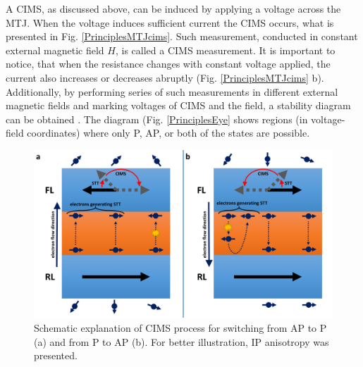 \label{sec:PrinciplesCIMSmeas}   
    A CIMS, as discussed above, can be induced by applying a voltage across the MTJ. When the voltage induces sufficient current the CIMS occurs, what is presented in Fig. \ref{PrinciplesMTJcims}. Such measurement, conducted in constant external magnetic field $H$, is called a CIMS measurement. It is important to notice, that when the resistance changes with constant voltage applied, the current also increases or decreases abruptly (Fig. \ref{PrinciplesMTJcims} b). Additionally, by performing series of such measurements in different external magnetic fields and marking voltages of CIMS and the field, a stability diagram can be obtained \cite{skowronski2017understanding}. The diagram (Fig. \ref{PrinciplesEye} shows regions (in voltage-field coordinates) where only P, AP, or both of the states are possible.
    
    \begin{figure}[H]
        \centering
        \includegraphics[width=0.75\paperwidth, page=1]{img/03/STT_sch.pdf}
        \caption{Schematic explanation of CIMS process for switching from AP to P (a) and from P to AP (b). For better illustration, IP anisotropy was presented.}
        \label{PrinciplesSTTsch}
    \end{figure}
    
